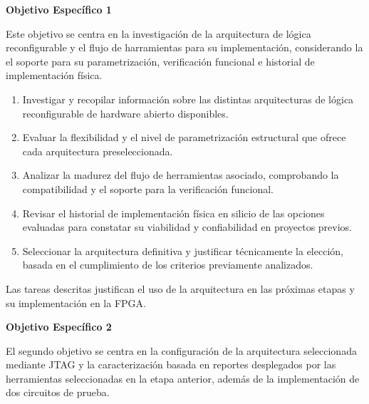 \textbf{\normalsize{Objetivo Específico 1}}

Este objetivo se centra en la investigación de la arquitectura de 
lógica reconfigurable y el flujo de harramientas para su implementación, 
considerando la el soporte para su parametrización, verificación 
funcional e historial de implementación física.

\begin{enumerate}

    \item Investigar y recopilar información sobre las distintas 
    arquitecturas de lógica reconfigurable de hardware abierto 
    disponibles.
     
    \item Evaluar la flexibilidad y el nivel de parametrización 
    estructural que ofrece cada arquitectura preseleccionada.
    
    \item Analizar la madurez del flujo de herramientas asociado, 
    comprobando la compatibilidad y el soporte para la verificación 
    funcional.

    \item Revisar el historial de implementación física en silicio 
    de las opciones evaluadas para constatar su viabilidad y 
    confiabilidad en proyectos previos. 

    \item Seleccionar la arquitectura definitiva y justificar técnicamente 
    la elección, basada en el cumplimiento de los criterios previamente 
    analizados.

\end{enumerate}

Las tareas descritas justifican el uso de la arquitectura en las próximas 
etapas y su implementación en la FPGA.

\textbf{\normalsize{Objetivo Específico 2}}

El segundo objetivo se centra en la configuración de la arquitectura 
seleccionada mediante JTAG y la caracterización basada en reportes 
desplegados por las herramientas seleccionadas en la etapa anterior, 
además de la implementación de dos circuitos de prueba.

